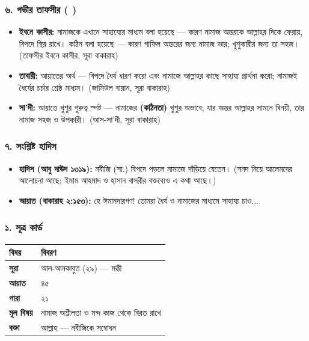 \subsubsection*{৬. গভীর তাফসীর ( )}

\begin{itemize}
\item \textbf{ইবনে কাসীর:} নামাজকে এখানে সাহায্যের মাধ্যম বলা হয়েছে — কারণ নামাজ অন্তরকে আল্লাহর দিকে ফেরায়, বিপদে স্থির রাখে। কঠিন বলা হয়েছে — কারণ গাফিল অন্তরের জন্য নামাজ ভার; খুশুকারীর জন্য তা সহজ। (তাফসীর ইবনে কাসীর, সূরা বাকারাহ)
\item \textbf{তাবারী:} আয়াতের অর্থ — বিপদে ধৈর্য ধারণ করো এবং নামাজে আল্লাহর কাছে সাহায্য প্রার্থনা করো; নামাজই ধৈর্যের চর্চার শ্রেষ্ঠ মাধ্যম। (জামিউল বায়ান, সূরা বাকারাহ)
\item \textbf{সা'দী:} আয়াতে খুশুর গুরুত্ব স্পষ্ট — নামাজের \textbf{ (কঠিনতা)} খুশুর অভাবে; যার অন্তর আল্লাহর সামনে বিনয়ী, তার নামাজ সহজ ও উপকারী। (আস-সা'দী, সূরা বাকারাহ)
\end{itemize}
\subsubsection*{৭. সংশ্লিষ্ট হাদিস}

\begin{itemize}
\item \textbf{হাদিস (আবু দাউদ ১৩১৯):} নবীজি (সা.) বিপদে পড়লে নামাজে দাঁড়িয়ে যেতেন। (সনদ নিয়ে আলেমদের আলোচনা আছে; ইমাম আহমাদ ও হাসান বাসরীর বক্তব্যেও এ কথা আছে।)
\item \textbf{আয়াত (বাকারাহ ২:১৫৩):} হে ঈমানদারগণ! তোমরা ধৈর্য ও নামাজের মাধ্যমে সাহায্য চাও...
\end{itemize}
\subsubsection*{১. সূত্র কার্ড}

\begin{table}[h]\centering\small
\begin{tabular}{ll}
বিষয় & বিবরণ \\
\hline
\textbf{সূরা} & আল-আনকাবুত (২৯) — মক্কী \\
\textbf{আয়াত} & ৪৫ \\
\textbf{পারা} & ২১ \\
\textbf{মূল বিষয়} & নামাজ অশ্লীলতা ও মন্দ কাজ থেকে বিরত রাখে \\
\textbf{বক্তা} & আল্লাহ — নবীজিকে সম্বোধন \\
\hline
\end{tabular}
\end{table}


